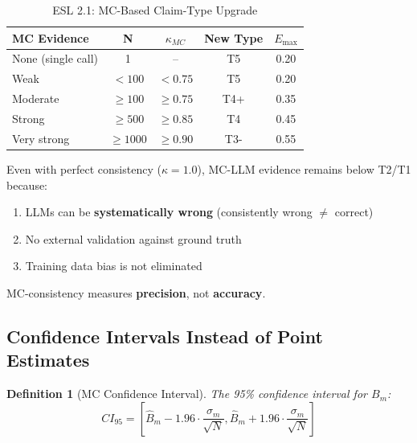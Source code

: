 \documentclass[11pt,a4paper]{article}
\newtheorem{definition}{Definition}[section]
\begin{document}
\begin{table}[h]
\centering
\caption{ESL 2.1: MC-Based Claim-Type Upgrade}
\label{tab:mc-upgrade}
\begin{tabular}{lcccc}
\toprule
\textbf{MC Evidence} & \textbf{N} & \textbf{$\kappa_{MC}$} & \textbf{New Type} & \textbf{$E_{\max}$} \\
\midrule
None (single call) & 1 & -- & T5 & 0.20 \\
Weak & $<100$ & $<0.75$ & T5 & 0.20 \\
Moderate & $\geq 100$ & $\geq 0.75$ & T4+ & 0.35 \\
Strong & $\geq 500$ & $\geq 0.85$ & T4 & 0.45 \\
\rowcolor{green!10}
Very strong & $\geq 1000$ & $\geq 0.90$ & T3- & 0.55 \\
\bottomrule
\end{tabular}
\end{table}

\begin{warningbox}[title={Why Not Higher Than T3-?}]
Even with perfect consistency ($\kappa = 1.0$), MC-LLM evidence remains below T2/T1 because:
\begin{enumerate}
    \item LLMs can be \textbf{systematically wrong} (consistently wrong $\neq$ correct)
    \item No external validation against ground truth
    \item Training data bias is not eliminated
\end{enumerate}
MC-consistency measures \textbf{precision}, not \textbf{accuracy}.
\end{warningbox}

\subsection{Confidence Intervals Instead of Point Estimates}

\begin{definition}[MC Confidence Interval]
\label{def:mc-ci}
The 95\% confidence interval for $B_m$:
\begin{equation}
CI_{95} = \left[ \hat{B}_m - 1.96 \cdot \frac{\sigma_m}{\sqrt{N}}, \hat{B}_m + 1.96 \cdot \frac{\sigma_m}{\sqrt{N}} \right]
\end{equation}
\end{definition}
\end{document}
